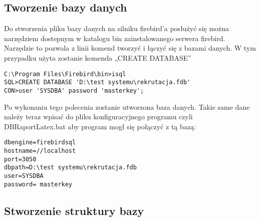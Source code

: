 \subsection{ Tworzenie bazy danych }

Do stworzenia pliku bazy danych na silniku firebird’a posłużyć się można narzędziem dostepnym w katalogu bin zainstalowanego serwera firebird.  Narzędzie to pozwala z linii komend tworzyć i łączyć się z bazami danych. W tym przypadku użyta zostanie komenda „CREATE DATABASE”
\begin{verbatim}
C:\Program Files\Firebird\bin>isql
SQL>CREATE DATABASE 'D:\test systemu\rekrutacja.fdb'
CON>user 'SYSDBA' password 'masterkey';
\end{verbatim}
Po wykonaniu tego polecenia zostanie utworzona baza danych. Takie same dane należy teraz wpisać do pliku konfiguracyjnego programu czyli DBRaportLatex.bat aby program mogł się połączyć z tą bazą:
\begin{verbatim}
dbengine=firebirdsql
hostname=//localhost
port=3050
dbpath=D:\test systemu\rekrutacja.fdb
user=SYSDBA
password= masterkey
\end{verbatim}
\subsection{ Stworzenie struktury bazy}

